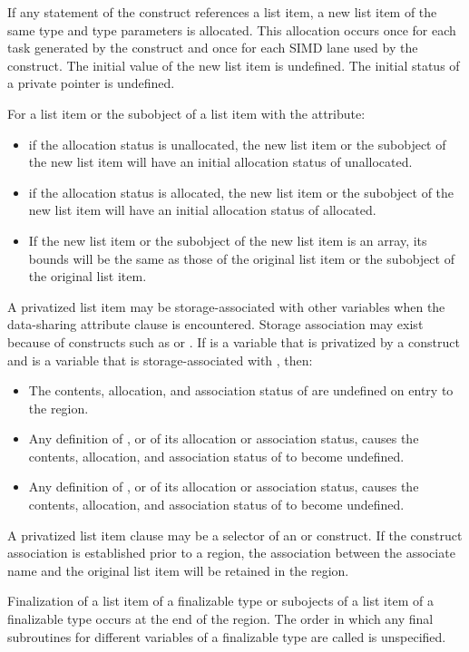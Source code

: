\begin{fortranspecific}
If any statement of the construct references a list item, a new list
item of the same type and type parameters is allocated. This
allocation occurs once for each task generated by the construct and
once for each SIMD lane used by the construct. The initial value of
the new list item is undefined. The initial status of a private
pointer is undefined.

For a list item or the subobject of a list item with the  attribute:

\begin{itemize}
\item if the allocation status is unallocated, the new list item or the subobject
of the new list item will have an initial allocation status of unallocated.

\item if the allocation status is allocated, the new list item or the subobject of
the new list item will have an initial allocation status of allocated.

\item If the new list item or the subobject of the new list item is an array, its bounds will be
the same as those of the original list item or the subobject of the original list item.
\end{itemize}

A privatized list item may be storage-associated with other
variables when the data-sharing attribute clause is encountered. Storage association may exist
because of constructs such as  or . If 
is a variable that is privatized by a construct and  is a variable that is storage-associated with , then:

\begin{itemize}
\item The contents, allocation, and association status of  are undefined on entry to the region.

\item Any definition of , or of its allocation or association status, causes the contents,
allocation, and association status of  to become undefined.

\item Any definition of , or of its allocation or association status, causes the contents,
allocation, and association status of  to become undefined.
\end{itemize}

A privatized list item clause may be a selector of an  or
 construct. If the construct association is established
prior to a  region, the association between the associate name
and the original list item will be retained in the region.

Finalization of a list item of a finalizable type or subojects of a
list item of a finalizable type occurs at the end of the region. The
order in which any final subroutines for different variables of a
finalizable type are called is unspecified.
\end{fortranspecific}

